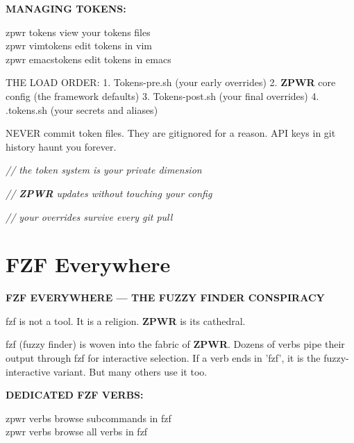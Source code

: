 \documentclass[11pt,a4paper,twoside]{book}
\begin{document}
\vspace{12pt}
{\bfseries\color{neonyellow} MANAGING TOKENS:}\vspace{4pt}

\begin{codebox}
\color{neongreen}zpwr tokens           view your tokens files\\
\color{neongreen}zpwr vimtokens        edit tokens in vim\\
\color{neongreen}zpwr emacstokens      edit tokens in emacs\\
\end{codebox}

THE LOAD ORDER: 1. Tokens-pre.sh      (your early overrides) 2. \textbf{ZPWR} core config    (the framework defaults) 3. Tokens-post.sh     (your final overrides) 4. .tokens.sh         (your secrets and aliases)

NEVER commit token files. They are gitignored for a reason. API keys in git history haunt you forever.

{\small\itshape\color{dimtext} // the token system is your private dimension}

{\small\itshape\color{dimtext} // \textbf{ZPWR} updates without touching your config}

{\small\itshape\color{dimtext} // your overrides survive every git pull}


\vspace{16pt}

\section{FZF Everywhere}


\vspace{10pt}
{\large\bfseries\color{neoncyan} FZF EVERYWHERE — THE FUZZY FINDER CONSPIRACY}\vspace{6pt}

fzf is not a tool. It is a religion. \textbf{ZPWR} is its cathedral.

fzf (fuzzy finder) is woven into the fabric of \textbf{ZPWR}. Dozens of verbs pipe their output through fzf for interactive selection. If a verb ends in 'fzf', it is the fuzzy-interactive variant. But many others use it too.


\vspace{12pt}
{\bfseries\color{neonyellow} DEDICATED FZF VERBS:}\vspace{4pt}

\begin{codebox}
\color{neongreen}zpwr verbs     browse subcommands in fzf\\
\color{neongreen}zpwr verbs           browse all verbs in fzf\\
\end{codebox}
\end{document}
